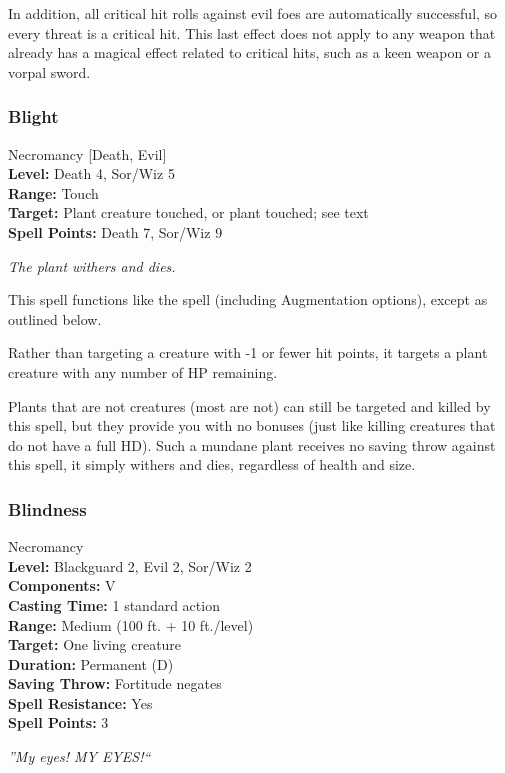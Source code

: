 In addition, all critical hit rolls against evil foes are automatically successful, so every threat is a critical hit. 
This last effect does not apply to any weapon that already has a magical effect related to critical hits, such as a keen weapon or a vorpal sword.
\subsubsection{Blight}
\label{Spell:Blight}
Necromancy [Death, Evil]
\\ \textbf{Level:} Death 4, Sor/Wiz 5
\\ \textbf{Range:} Touch
\\ \textbf{Target:} Plant creature touched, or plant touched; see text
\\ \textbf{Spell Points:} Death 7, Sor/Wiz 9

\emph{The plant withers and dies.}

This spell functions like the  spell (including Augmentation options), 
except as outlined below.

Rather than targeting a creature with -1 or fewer hit points, it targets a plant creature with any number of HP remaining.

Plants that are not creatures (most are not) can still be targeted and killed by this spell,
but they provide you with no bonuses (just like killing creatures that do not have a full HD).
Such a mundane plant receives no saving throw against this spell, it simply withers and dies,
regardless of health and size.
\subsubsection{Blindness}
\label{Spell:Blindness}
Necromancy
\\ \textbf{Level:} Blackguard 2, Evil 2, Sor/Wiz 2
\\ \textbf{Components:} V
\\ \textbf{Casting Time:} 1 standard action
\\ \textbf{Range:} Medium (100 ft. + 10 ft./level)
\\ \textbf{Target:} One living creature
\\ \textbf{Duration:} Permanent (D)
\\ \textbf{Saving Throw:} Fortitude negates
\\ \textbf{Spell Resistance:} Yes
\\ \textbf{Spell Points:} 3

\emph{''My eyes! MY EYES!``}

